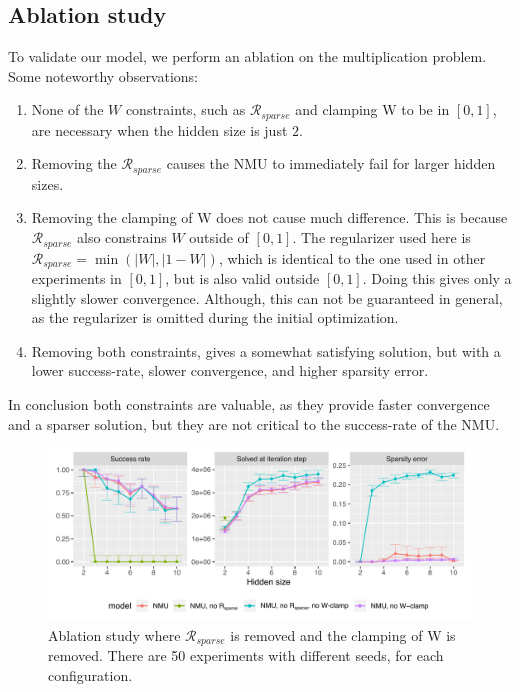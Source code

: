 \subsection{Ablation study}
\label{sec:appendix:ablation-study}
To validate our model, we perform an ablation on the multiplication problem. Some noteworthy observations:

\begin{enumerate}
    \item None of the $W$ constraints, such as $\mathcal{R}_{sparse}$ and clamping W to be in $[0, 1]$, are necessary when the hidden size is just $2$.
    \item Removing the $\mathcal{R}_{sparse}$ causes the NMU to immediately fail for larger hidden sizes.
    \item Removing the clamping of W does not cause much difference. This is because $\mathcal{R}_{sparse}$ also constrains $W$ outside of $[0, 1]$. The regularizer used here is $\mathcal{R}_{sparse} = \min(|W|, |1 - W|)$, which is identical to the one used in other experiments in $[0, 1]$, but is also valid outside $[0, 1]$. Doing this gives only a slightly slower convergence. Although, this can not be guaranteed in general, as the regularizer is omitted during the initial optimization.
    \item Removing both constraints, gives a somewhat satisfying solution, but with a lower success-rate, slower convergence, and higher sparsity error.
\end{enumerate}

In conclusion both constraints are valuable, as they provide faster convergence and a sparser solution, but they are not critical to the success-rate of the NMU.

\begin{figure}[h]
\centering
\includegraphics[width=\linewidth]{results/simple_function_static_mul_hidden_size_ablation.pdf}
\caption{Ablation study where $\mathcal{R}_{sparse}$ is removed and the clamping of W is removed. There are 50 experiments with different seeds, for each configuration.}
\label{fig:simple-function-static-ablation}
\end{figure}

